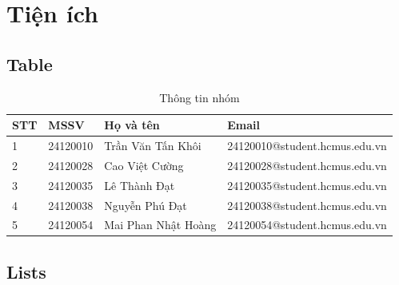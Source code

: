 \chapter{Tiện ích}

\newpage

\section{Table}

\begin{table}[h!]
    \centering
    \renewcommand{\arraystretch}{1.3}
    \setlength{\tabcolsep}{6pt}
    \begin{tabular}{|p{1cm}|p{2cm}|p{5cm}|p{6cm}|}
        \hline
        \rowcolor[rgb]{0.8, 0.9, 1.0}
        \textbf{STT} & \textbf{MSSV} & \textbf{Họ và tên} & \textbf{Email} \\ \hline
        1 & 24120010 & Trần Văn Tấn Khôi & 24120010@student.hcmus.edu.vn \\ \hline
        2 & 24120028 & Cao Việt Cường & 24120028@student.hcmus.edu.vn \\ \hline
        3 & 24120035 & Lê Thành Đạt & 24120035@student.hcmus.edu.vn \\ \hline
        4 & 24120038 & Nguyễn Phú Đạt & 24120038@student.hcmus.edu.vn \\ \hline
        5 & 24120054 & Mai Phan Nhật Hoàng & 24120054@student.hcmus.edu.vn \\ \hline
    \end{tabular}
    \caption{Thông tin nhóm}
\end{table}

\section{Lists}

